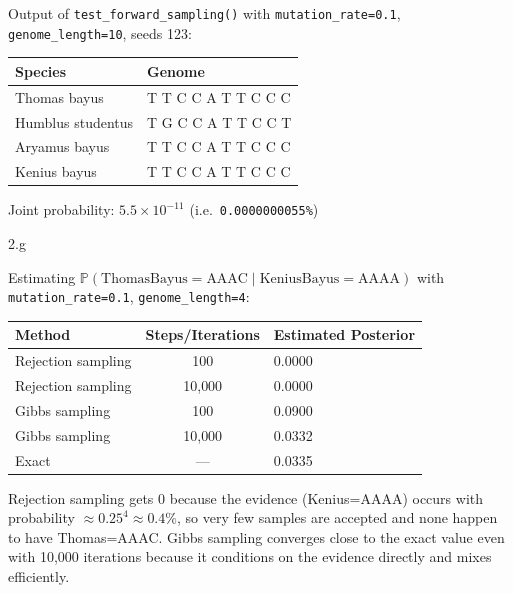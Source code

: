 \begin{answer}
  Output of \texttt{test\_forward\_sampling()} with \texttt{mutation\_rate=0.1}, \texttt{genome\_length=10}, seeds 123:

  \begin{center}
  \begin{tabular}{|l|l|}
  \hline
  \textbf{Species} & \textbf{Genome} \\
  \hline
  Thomas bayus      & T T C C A T T C C C \\
  Humblus studentus & T G C C A T T C C T \\
  Aryamus bayus     & T T C C A T T C C C \\
  Kenius bayus      & T T C C A T T C C C \\
  \hline
  \end{tabular}
  \end{center}

  Joint probability: $5.5 \times 10^{-11}$ (i.e.\ \texttt{0.0000000055\%})
\end{answer}

\LARGE
2.g
\normalsize

\begin{answer}
  Estimating $\mathbb{P}(\text{ThomasBayus}=\text{AAAC} \mid \text{KeniusBayus}=\text{AAAA})$
  with \texttt{mutation\_rate=0.1}, \texttt{genome\_length=4}:

  \begin{center}
  \begin{tabular}{|l|c|l|}
  \hline
  \textbf{Method} & \textbf{Steps/Iterations} & \textbf{Estimated Posterior} \\
  \hline
  Rejection sampling & 100      & 0.0000 \\
  Rejection sampling & 10{,}000 & 0.0000 \\
  Gibbs sampling     & 100      & 0.0900 \\
  Gibbs sampling     & 10{,}000 & 0.0332 \\
  Exact              & ---      & 0.0335 \\
  \hline
  \end{tabular}
  \end{center}

  Rejection sampling gets 0 because the evidence (Kenius=AAAA) occurs with probability $\approx 0.25^4 \approx 0.4\%$, so very few samples are accepted and none happen to have Thomas=AAAC. Gibbs sampling converges close to the exact value even with 10{,}000 iterations because it conditions on the evidence directly and mixes efficiently.
\end{answer}
\clearpage

